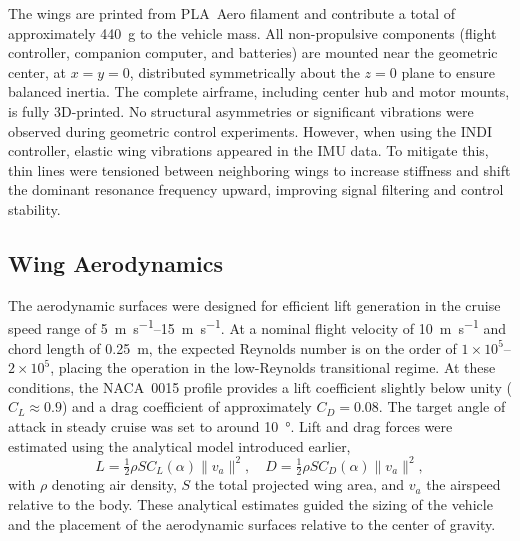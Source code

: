 The wings are printed from PLA~Aero filament and contribute a total of approximately \SI{440}{\gram} to the vehicle mass.  
All non-propulsive components (flight controller, companion computer, and batteries) are mounted near the geometric center, at \(x=y=0\), distributed symmetrically about the \(z=0\) plane to ensure balanced inertia.  
The complete airframe, including center hub and motor mounts, is fully 3D-printed.  
No structural asymmetries or significant vibrations were observed during geometric control experiments.  
However, when using the INDI controller, elastic wing vibrations appeared in the IMU data.  
To mitigate this, thin lines were tensioned between neighboring wings to increase stiffness and shift the dominant resonance frequency upward, improving signal filtering and control stability.

\subsection{Wing Aerodynamics}

The aerodynamic surfaces were designed for efficient lift generation in the cruise speed range of \SIrange{5}{15}{\meter\per\second}.  
At a nominal flight velocity of \SI{10}{\meter\per\second} and chord length of \SI{0.25}{\meter}, the expected Reynolds number is on the order of \(1\times10^5\)–\(2\times10^5\), placing the operation in the low-Reynolds transitional regime.  
At these conditions, the NACA~0015 profile provides a lift coefficient slightly below unity (\(C_L \approx 0.9\)) and a drag coefficient of approximately \(C_D = 0.08\).  
The target angle of attack in steady cruise was set to around \SI{10}{\degree}.  
Lift and drag forces were estimated using the analytical model introduced earlier,
\[
L = \tfrac{1}{2} \rho S C_L(\alpha) \|v_a\|^2, \quad
D = \tfrac{1}{2} \rho S C_D(\alpha) \|v_a\|^2,
\]
with \(\rho\) denoting air density, \(S\) the total projected wing area, and \(v_a\) the airspeed relative to the body.  
These analytical estimates guided the sizing of the vehicle and the placement of the aerodynamic surfaces relative to the center of gravity.

